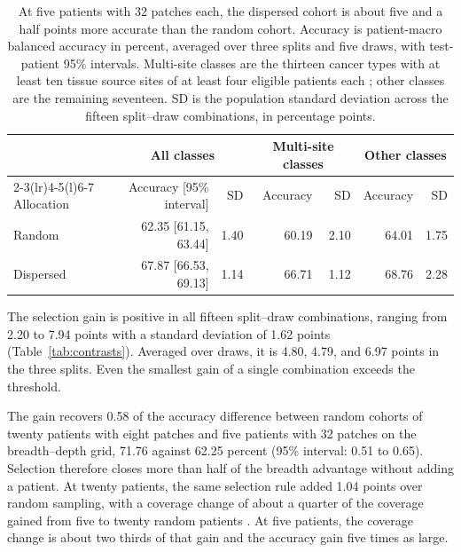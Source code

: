 \begin{table}[htbp]
\centering
\small
\renewcommand{\arraystretch}{1.15}
\begin{tabular}{@{}lrrrrrr@{}}
\toprule
 & \multicolumn{2}{c}{All classes} & \multicolumn{2}{c}{Multi-site classes} & \multicolumn{2}{c}{Other classes} \\
\cmidrule(lr){2-3}\cmidrule(lr){4-5}\cmidrule(l){6-7}
Allocation & Accuracy [95\% interval] & SD & Accuracy & SD & Accuracy & SD \\
\midrule
Random & 62.35 [61.15, 63.44] & 1.40 & 60.19 & 2.10 & 64.01 & 1.75 \\
Dispersed & 67.87 [66.53, 69.13] & 1.14 & 66.71 & 1.12 & 68.76 & 2.28 \\
\bottomrule
\end{tabular}
\caption{At five patients with 32 patches each, the dispersed cohort is about five and a half points more accurate than the random cohort. Accuracy is patient-macro balanced accuracy in percent, averaged over three splits and five draws, with test-patient 95\% intervals. Multi-site classes are the thirteen cancer types with at least ten tissue source sites of at least four eligible patients each \citep{queisler2026siteCoverage}; other classes are the remaining seventeen. SD is the population standard deviation across the fifteen split--draw combinations, in percentage points.}
\label{tab:allocation-accuracy}
\end{table}

\noindent The selection gain is positive in all fifteen split--draw combinations, ranging from 2.20 to 7.94 points with a standard deviation of 1.62 points (Table~\ref{tab:contrasts}). Averaged over draws, it is 4.80, 4.79, and 6.97 points in the three splits. Even the smallest gain of a single combination exceeds the threshold.

The gain recovers 0.58 of the accuracy difference between random cohorts of twenty patients with eight patches and five patients with 32 patches on the breadth--depth grid, 71.76 against 62.25 percent (95\% interval: 0.51 to 0.65). Selection therefore closes more than half of the breadth advantage without adding a patient. At twenty patients, the same selection rule added 1.04 points over random sampling, with a coverage change of about a quarter of the coverage gained from five to twenty random patients \citep{queisler2026cohortComposition}. At five patients, the coverage change is about two thirds of that gain and the accuracy gain five times as large.

